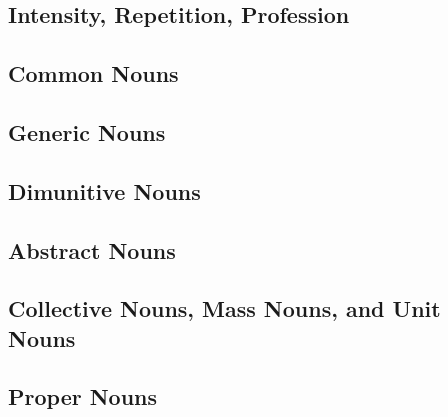 \documentclass[grammar]{subfiles}
\begin{document}
	\subsection{Intensity, Repetition, Profession}
	\label{ssec:dev_nouns_intensity_repetition_profession}

	\ToBeWritten

	\subsection{Common Nouns}
	\label{ssec:dev_common_nouns}

	\ToBeWritten

	\subsection{Generic Nouns}
	\label{ssec:dev_generic_nouns}

	\ToBeWritten

	\subsection{Dimunitive Nouns}
	\label{ssec:dev_dimunitive_nouns}

	\ToBeWritten

	\subsection{Abstract Nouns}
	\label{ssec:dev_abstract_nouns}

	\ToBeWritten

	\subsection{Collective Nouns, Mass Nouns, and Unit Nouns}
	\label{ssec:dev_collective_mass_unit}

	\ToBeWritten

	\subsection{Proper Nouns}
	\label{ssec:dev_proper_nouns}

	\ToBeWritten
\end{document}
